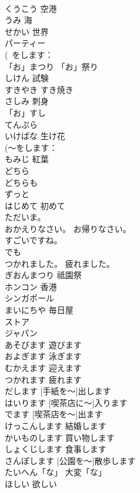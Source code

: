 \documentclass[8pt]{extreport}
\begin{document}
\begin{CJK}{UTF8}{min}
\\	くうこう	空港	
\\	うみ	海	
\\	せかい	世界	
\\	パーティー			
\\	(~をします：
\\	「お」まつり	「お」祭り	
\\	しけん	試験	
\\	すきやき	すき焼き	
\\	さしみ	刺身	
\\	「お」すし			
\\	てんぷら			
\\	いけばな	生け花	
\\	(～をします：
\\	もみじ	紅葉	
\\	どちら			
\\	どちらも			
\\	ずっと			
\\	はじめて	初めて	
\\	ただいま。			
\\	おかえりなさい。	お帰りなさい。	
\\	すごいですね。			
\\	でも			
\\	つかれました。	疲れました。	
\\	ぎおんまつり	祗園祭	
\\	ホンコン	香港	
\\	シンガポール			
\\	まいにちや	毎日屋	
\\	ストア			
\\	ジャパン			
\\	あそびます	遊びます	
\\	およぎます	泳ぎます	
\\	むかえます	迎えます	
\\	つかれます	疲れます	
\\	[てがみを～]だします	[手紙を～]出します	
\\	[きっさてんに～]はいります	[喫茶店に～]入ります	
\\	[きっさてんを～]でます	[喫茶店を～]出ます	
\\	けっこんします	結婚します	
\\	かいものします	買い物します	
\\	しょくじします	食事します	
\\	[こうえんを～]さんぽします	[公園を～]散歩します	
\\	たいへん「な」	大変「な」	
\\	ほしい	欲しい	

\end{CJK}
\end{document}
